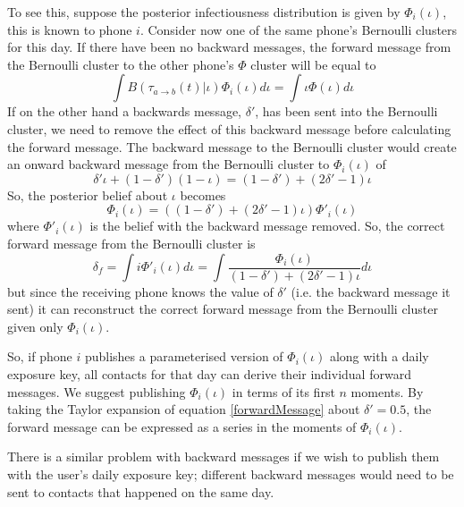 \documentclass{article}
\begin{document}
To see this, suppose the posterior infectiousness distribution is given by $\Phi_i(\iota)$, this is known to phone $i$. Consider now one of the same phone's Bernoulli clusters for this day. If there have been no backward messages, the forward message from the Bernoulli cluster to the other phone's $\Phi$ cluster will be equal to
\[
\int B(\tau_{a\rightarrow b}(t)|\iota)\Phi_i(\iota) d\iota = \int \iota\Phi(\iota) d\iota
\]
If on the other hand a backwards message, $\delta'$, has been sent into the Bernoulli cluster, we need to remove the effect of this backward message before calculating the forward message. The backward message to the Bernoulli cluster would create an onward backward message from the Bernoulli cluster to $\Phi_i(\iota)$ of
\[
\delta'\iota + (1-\delta')(1-\iota) = (1 - \delta') + (2\delta' - 1)\iota
\]
So, the posterior belief about $\iota$ becomes
\[
\Phi_i(\iota) = ((1 - \delta') + (2\delta' - 1)\iota)\Phi'_i(\iota)
\]
where $\Phi'_i(\iota)$ is the belief with the backward message removed. So, the correct forward message from the Bernoulli cluster is
\begin{equation}
\delta_f = \int i \Phi'_i(\iota) d\iota = \int \frac{\Phi_i(\iota)}{(1 - \delta') + (2\delta' - 1)\iota} d\iota
\label{forwardMessage}
\end{equation}
but since the receiving phone knows the value of $\delta'$ (i.e. the backward message it sent) it can reconstruct the correct forward message from the Bernoulli cluster given only $\Phi_i(\iota)$.

So, if phone $i$ publishes a parameterised version of $\Phi_i(\iota)$ along with a daily exposure key, all contacts for that day can derive their individual forward messages. We suggest publishing $\Phi_i(\iota)$ in terms of its first $n$ moments. By taking the Taylor expansion of equation \ref{forwardMessage} about $\delta' = 0.5$, the forward message can be expressed as a series in the moments of $\Phi_i(\iota)$.

There is a similar problem with backward messages if we wish to publish them with the user's daily exposure key; different backward messages would need to be sent to contacts that happened on the same day.
\end{document}
